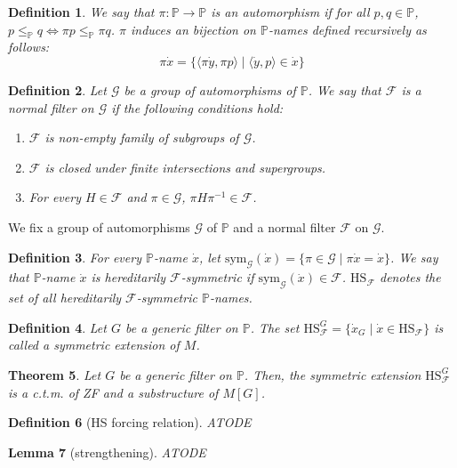 \documentclass{report}
\newtheorem{thm}{Theorem}[chapter]
\newtheorem{lem}[thm]{Lemma}
\newtheorem{dfn}[thm]{Definition}
\newcommand{\Pbb}{\mathbb{P}}
\newcommand{\Gcal}{\mathcal{G}}
\newcommand{\Fcal}{\mathcal{F}}
\begin{document}
\begin{dfn} 
  We say that $\pi : \Pbb \rightarrow \Pbb$ is an \emph{automorphism} if for all $p, q \in \Pbb$, $p \leq_{\Pbb} q \Leftrightarrow \pi p \leq_{\Pbb} \pi q$.
  $\pi$ induces an bijection on $\Pbb$-names defined recursively as follows:
  $$ \pi \dot{x} = \{ \langle \pi \dot{y}, \pi p \rangle \mid \langle \dot{y}, p \rangle \in \dot{x} \} $$
\end{dfn}

\begin{dfn} %
  Let $\Gcal$ be a group of automorphisms of $\Pbb$. We say that $\Fcal$ is a \emph{normal filter} on $\Gcal$ if the following conditions hold:
  \begin{enumerate}
    \item $\Fcal$ is non-empty family of subgroups of $\Gcal$.
    \item $\Fcal$ is closed under finite intersections and supergroups.
    \item For every $H \in \Fcal$ and $\pi \in \Gcal$, $\pi H \pi^{-1} \in \Fcal$.
  \end{enumerate}
\end{dfn}

We fix a group of automorphisms $\Gcal$ of $\Pbb$ and a normal filter $\Fcal$ on $\Gcal$.
\begin{dfn} 
  For every $\Pbb$-name $\dot{x}$, let $\text{sym}_{\Gcal}(\dot{x}) = \{ \pi \in \Gcal \mid \pi \dot{x} = \dot{x} \}$.
  We say that $\Pbb$-name $\dot{x}$ is \emph{hereditarily $\Fcal$-symmetric} if $\text{sym}_{\Gcal}(\dot{x}) \in \Fcal$.
  $\text{HS}_{\Fcal}$ denotes the set of all hereditarily $\Fcal$-symmetric $\Pbb$-names.
\end{dfn}

\begin{dfn} 
  Let $G$ be a generic filter on $\Pbb$. The set $\text{HS}^{G}_{\Fcal} = \{ \dot{x}_G \mid \dot{x} \in \text{HS}_{\Fcal} \}$ is called a \emph{symmetric extension} of $M$.
\end{dfn}

\begin{thm}
  Let $G$ be a generic filter on $\Pbb$. Then, the symmetric extension $\text{HS}^{G}_{\Fcal}$ is a c.t.m. of ZF and a substructure of $M[G]$.
\end{thm}

\begin{dfn} [HS forcing relation]
  ATODE
\end{dfn}

\begin{lem}[strengthening]
  ATODE
\end{lem}
\end{document}
